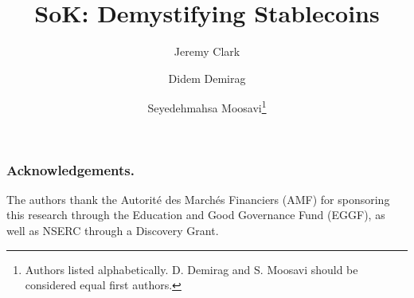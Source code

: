 \documentclass[runningheads]{llncs}
\begin{document}
%
\title{SoK: Demystifying Stablecoins}
%

\author{Jeremy Clark  \and Didem Demirag \and Seyedehmahsa Moosavi\thanks{Authors listed alphabetically. D. Demirag and S. Moosavi should be considered equal first authors.}}




\maketitle              %
%




\subsubsection*{Acknowledgements.}
The authors thank the Autorit\'e des March\'es Financiers (AMF) for sponsoring this research through the Education and Good Governance Fund (EGGF), as well as NSERC through a Discovery Grant.

%
%
%
 

%
\end{document}
